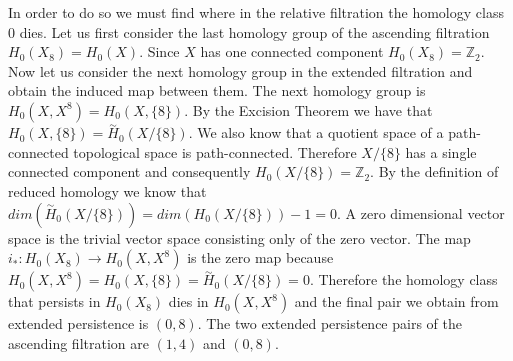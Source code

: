 In order to do so we must find where in the relative filtration the homology class $0$ dies. Let us first consider the last homology group of the ascending filtration $H_0(X_8) = H_0(X)$. Since $X$ has one connected component $H_0(X_8) = \mathbb{Z}_2$. Now let us consider the next homology group in the extended filtration and obtain the induced map between them. The next homology group is $H_0(X, X^8) = H_0(X, \{8\})$. By the Excision Theorem we have that $H_0(X, \{8\}) = \overset{\sim}{H}_0(X / \{8\})$. We also know that a quotient space of a path-connected topological space is path-connected. Therefore $X / \{8\}$ has a single connected component and consequently $H_0(X / \{8\}) =\mathbb{Z}_2$.
By the definition of reduced homology we know that $dim(\overset{\sim}{H}_0(X / \{8\})) = dim(H_0(X / \{8\})) - 1 = 0$.
A zero dimensional vector space is the trivial vector space consisting only of the zero vector. The map $i_* : H_0(X_8) \to H_0(X, X^8)$ is the zero map because $H_0(X, X^8) = H_0(X, \{8\}) = \overset{\sim}{H}_0(X / \{8\}) = 0$. Therefore the homology class that persists in $H_0(X_8)$ dies in $H_0(X, X^8)$ and the final pair we obtain from extended persistence is $(0, 8)$. The two extended persistence pairs of the ascending filtration are $(1, 4)$ and $(0, 8)$.


